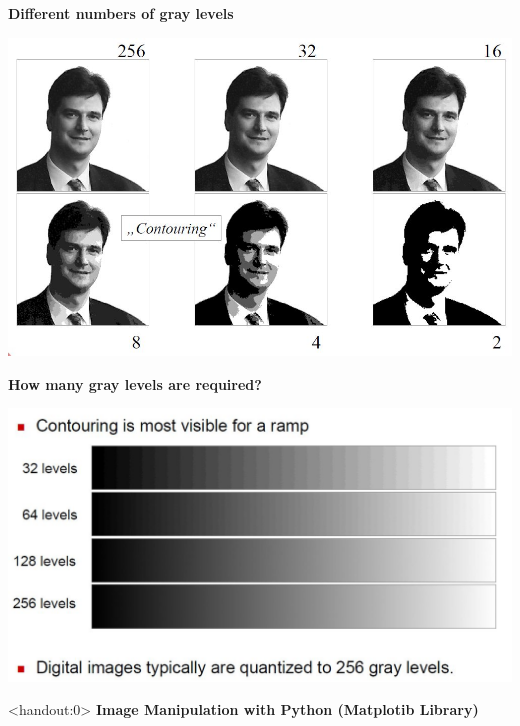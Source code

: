\documentclass{beamer}
\begin{document}
\begin{frame}
	
	{\textbf{Different numbers of gray levels}}
	
	
	\includegraphics[scale = 0.3]{./images/gray1_example.jpg}
\end{frame}


\begin{frame}
	
	{\textbf{How many gray levels are required?}}
	
	\includegraphics[scale = 0.3]{./images/gray2_example.jpg}
\end{frame}





\begin{frame}<handout:0>
\textbf{	Image Manipulation with Python (Matplotib Library)}
\end{frame}
\end{document}
